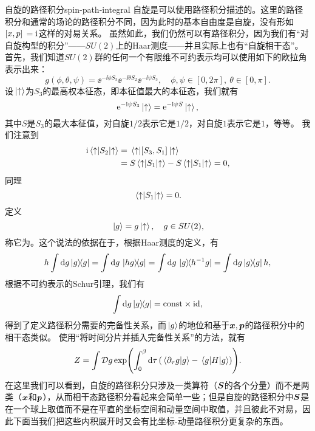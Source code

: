\begin{back}{自旋的路径积分}{spin-path-integral}
    自旋是可以使用路径积分描述的。这里的路径积分和通常的场论的路径积分不同，因为此时的基本自由度是自旋，没有形如$\comm*{x}{p} = \ii$这样的对易关系。
    虽然如此，我们仍然可以有路径积分，因为我们有“对自旋构型的积分”——$SU(2)$上的Haar测度——并且实际上也有“自旋相干态”。
    首先，我们知道$SU(2)$群的任何一个有限维不可约表示均可以使用如下的欧拉角表示出来：
    \begin{equation}
        g(\phi, \theta, \psi) = \ee^{- \ii \phi S_3} \ee^{- \ii \theta S_2} \ee^{- \ii \psi S_3}, \quad \phi, \psi \in [0, 2\pi], \ \theta \in [0, \pi].
    \end{equation}
    设$\ket*{\uparrow}$为$S_3$的最高权本征态，即本征值最大的本征态，我们就有
    \begin{equation}
        \mathrm{e}^{- \mathrm{i} \psi S_3} \ket*{\uparrow} = \mathrm{e}^{- \mathrm{i} \psi S} \ket*{\uparrow},
    \end{equation}
    其中$S$是$S_3$的最大本征值，对自旋$1/2$表示它是$1/2$，对自旋$1$表示它是$1$，等等。
    我们注意到
    \[
        \begin{aligned}
            \ii \mel*{\uparrow}{S_2}{\uparrow} &= \mel*{\uparrow}{\comm*{S_3}{S_1}}{\uparrow} \\
            &= S \mel*{\uparrow}{S_1}{\uparrow} - S \mel*{\uparrow}{S_1}{\uparrow} = 0,
        \end{aligned}
    \]
    同理
    \[
        \mel*{\uparrow}{S_1}{\uparrow} = 0.
    \]
    定义
    \begin{equation}
        \ket*{g} = g \ket*{\uparrow}, \quad g \in SU(2),
    \end{equation}
    称它为。这个说法的依据在于，根据Haar测度的定义，有
    \[
        h \int \dd{g} \dyad{g} = \int \dd{g} \dyad*{hg}{g} = \int \dd{g} \dyad*{g}{h^{-1} g} = \int \dd{g} \dyad{g} h, 
    \]
    根据不可约表示的Schur引理，我们有
    \begin{equation}
        \int \dd{g} \dyad{g} = \const \times \mathrm{id}, 
    \end{equation}
    得到了定义路径积分需要的完备性关系，而$\ket*{g}$的地位和基于$\vb*{x}, \vb*{p}$的路径积分中的相干态类似。
    使用“将时间分片并插入完备性关系”的方法，就有
    \begin{equation}
        Z = \int \mathcal{D} g \exp(\int_0^\beta \dd{\tau} (\braket*{\partial_\tau g}{g} - \mel*{g}{H}{g})).
        \label{eq:spin-partition-original}
    \end{equation}
    在这里我们可以看到，自旋的路径积分只涉及一类算符（$\vb*{S}$的各个分量）而不是两类（$\vb*{x}$和$\vb*{p}$），从而相干态路径积分看起来会简单一些；但是自旋的路径积分中$\vb*{S}$是在一个球上取值而不是在平直的坐标空间和动量空间中取值，并且彼此不对易，因此下面当我们把这些内积展开时又会有比坐标-动量路径积分更复杂的东西。


\end{back}
